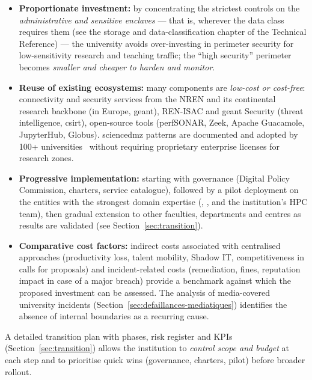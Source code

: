 \begin{itemize}[nosep]
    \item \textbf{Proportionate investment:} by concentrating the
    strictest controls on the \emph{administrative and sensitive
    enclaves} --- that is, wherever the data class requires them (see
    the storage and data-classification chapter of the Technical
    Reference) --- the university avoids over-investing in perimeter
    security for
    low-sensitivity research and teaching traffic; the ``high security''
    perimeter becomes \emph{smaller and cheaper to harden and monitor}.
    \item \textbf{Reuse of existing ecosystems:} many components are
    \emph{low-cost or cost-free}: connectivity and security services
    from the NREN and its continental research backbone (in Europe,
    \gls{geant}), REN-ISAC and \gls{geant} Security (threat intelligence,
    \gls{csirt}), open-source tools (perfSONAR, Zeek, Apache Guacamole,
    JupyterHub, Globus). \gls{sciencedmz} patterns are documented and
    adopted by 100+ universities~\cite{esnet-history,nsf-cc} without requiring proprietary
    enterprise licenses for research zones.
    \item \textbf{Progressive implementation:} starting with governance
    (Digital Policy Commission, charters, service catalogue), followed
    by a pilot deployment on the entities with the strongest domain
    expertise (, , and the institution's HPC team),
    then gradual extension to other faculties, departments and centres
    as results are validated (see Section~\ref{sec:transition}).
    \item \textbf{Comparative cost factors:} indirect costs
    associated with centralised approaches (productivity loss,
    talent mobility, Shadow IT, competitiveness in calls for
    proposals) and incident-related costs (remediation, fines,
    reputation impact in case of a major breach) provide a
    benchmark against which the proposed investment can be
    assessed. The analysis of media-covered university incidents
    (Section~\ref{sec:defaillances-mediatiques}) identifies the
    absence of internal boundaries as a recurring cause.
\end{itemize}

A detailed transition plan with phases, risk register and KPIs
(Section~\ref{sec:transition}) allows the institution to \emph{control
scope and budget} at each step and to prioritise quick wins
(governance, charters, pilot) before broader rollout.

